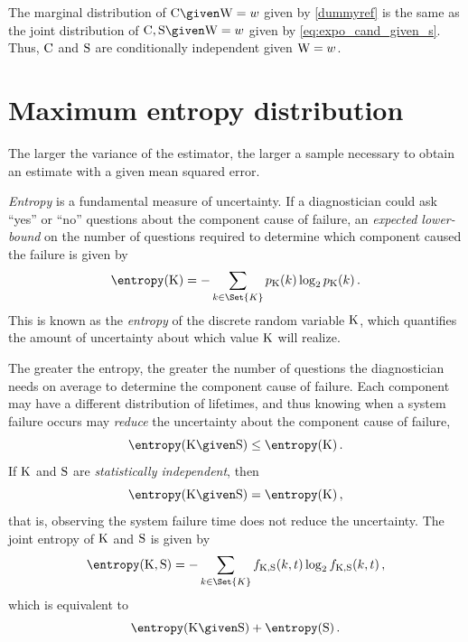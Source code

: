 \documentclass[../main.tex]{subfiles}
\begin{document}
The marginal distribution of $\rvcand \given \RV{W} = w$ given by 
\cref{dummyref} is the same as the joint distribution of $\rvcand, \sv \given 
\RV{W} = w$ given by \cref{eq:expo_cand_given_s}. Thus, $\mathrm{C}$ and $\mathrm{S}$ are 
conditionally independent given $\mathrm{W} = w$.

\section{Maximum entropy distribution}
The larger the variance of the estimator, the larger a sample necessary to 
obtain an estimate with a given mean squared error.

\emph{Entropy} is a fundamental measure of uncertainty. If a diagnostician 
could ask ``yes'' or ``no'' questions about the component 
cause of failure, an \emph{expected lower-bound} on the number of 
questions required to determine which component caused the failure is given by
\begin{equation}
\entropy(\RV{K}) = -\sum_{k \in \Set{K}} \pmf_{\RV{K}}(k) \log_2 
\pmf_{\RV{K}}(k)\,.
\end{equation}
This is known as the \emph{entropy} of the discrete random variable $\mathrm{K}$, 
which quantifies the amount of uncertainty about which value $\mathrm{K}$ will 
realize.

The greater the entropy, the greater the number of questions the diagnostician needs on average to determine the component cause of failure.
Each component may have a different distribution of lifetimes, and thus knowing when a system failure occurs may \emph{reduce} the uncertainty about the component cause of failure,
\begin{equation}
\entropy(\RV{K} \given \sv) \leq \entropy(\RV{K})\,.
\end{equation}
If $\mathrm{K}$ and $\mathrm{S}$ are \emph{statistically independent}, then
\begin{equation}
\entropy(\RV{K} \given \sv) = \entropy(\RV{K})\,,
\end{equation}
that is, observing the system failure time does not reduce the uncertainty.
The joint entropy of $\mathrm{K}$ and $\mathrm{S}$ is given by
\begin{equation}
\entropy(\RV{K}, \sv) = -\sum_{k \in \Set{K}} 
\pdf_{\RV{K},\sv}(k,t) \log_2 \pdf_{\RV{K},\sv}(k,t)\,,
\end{equation}
which is equivalent to
\begin{equation}
\entropy(\RV{K} \given \sv) + \entropy(\sv)\,.
\end{equation}
\end{document}
